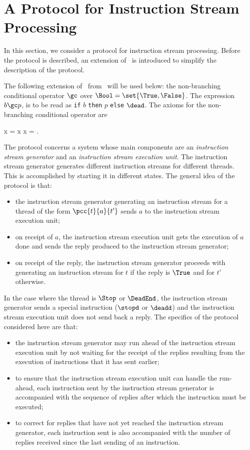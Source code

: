 \documentclass[fleqn]{llncs}
\begin{document}
\section{A Protocol for Instruction Stream Processing}
\label{sect-protocol}

In this section, we consider a protocol for instruction stream
processing.
Before the protocol is described, an extension of \ACP\ is introduced
to simplify the description of the protocol.

The following extension of \ACP\ from~\cite{BB92c} will be used below:
the non-branching conditional operator $\gc$ over
$\Bool = \set{\True,\False}$.
The expression $b \gc p$, is to be read as
\texttt{if} $b$ \texttt{then} $p$ \texttt{else} $\dead$.
The axioms for the non-branching conditional operator are
\begin{ldispl}
\True \gc x = x \quad {} \quad \False \gc x = \dead\;.
\end{ldispl}

The protocol concerns a system whose main components are an
\emph{instruction stream generator} and an \emph{instruction stream
execution unit}.
The instruction stream generator generates different instruction
streams for different threads.
This is accomplished by starting it in different states.
The general idea of the protocol is that:
\begin{itemize}
\item
the instruction stream generator generating an instruction stream for a
thread of the form $\pcc{t}{a}{t'}$ sends $a$ to the instruction stream
execution unit;
\item
on receipt of $a$, the instruction stream execution unit gets the
execution of $a$ done and sends the reply produced to the instruction
stream generator;
\item
on receipt of the reply, the instruction stream generator proceeds with
generating an instruction stream for $t$ if the reply is $\True$ and for
$t'$ otherwise.
\end{itemize}
In the case where the thread is $\Stop$ or $\DeadEnd$, the instruction
stream generator sends a special instruction ($\stopd$ or $\deadd$) and
the instruction stream execution unit does not send back a reply.
The specifics of the protocol considered here are that:
\begin{itemize}
\item
the instruction stream generator may run ahead of the instruction stream
execution unit by not waiting for the receipt of the replies resulting
from the execution of instructions that it has sent earlier;
\item
to ensure that the instruction stream execution unit can handle the
run-ahead, each instruction sent by the instruction stream generator is
accompanied with the sequence of replies after which the instruction
must be executed;
\item
to correct for replies that have not yet reached the instruction stream
generator, each instruction sent is also accompanied with the number of
replies received since the last sending of an instruction.
\end{itemize}
\end{document}
